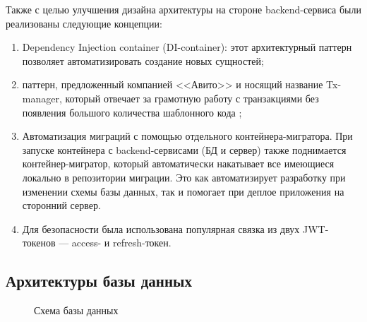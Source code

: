 \documentclass[diploma]{SCWorks}
\begin{document}
Также с целью улучшения дизайна архитектуры на стороне backend-сервиса были 
реализованы следующие концепции:
\begin{enumerate}
    \item Dependency Injection container (DI-container): этот архитектурный 
    паттерн позволяет автоматизировать создание новых сущностей;
    \item паттерн, предложенный компанией <<Авито>> и носящий название 
    Tx-manager, который отвечает за грамотную работу с транзакциями без 
    появления большого количества шаблонного кода \cite{txmanager};
    \item Автоматизация миграций с помощью отдельного контейнера-мигратора.
    При запуске контейнера с backend-сервисами (БД и сервер) также поднимается
    контейнер-мигратор, который автоматически накатывает все имеющиеся локально
    в репозитории миграции. Это как автоматизирует разработку при изменении 
    схемы базы данных, так и помогает при деплое приложения на сторонний сервер.
    \item Для безопасности была использована популярная связка из двух 
    JWT-токенов — access- и refresh-токен.
\end{enumerate}


\subsection{Архитектуры базы данных}

\begin{figure}[H]
	\caption{Схема базы данных}
	\label{pic:database}
\end{figure}
\end{document}
